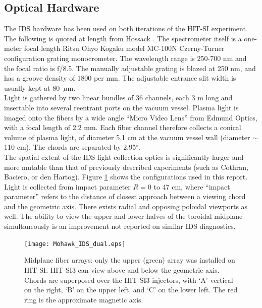 	\subsection{Optical Hardware}
	\hspace{4ex}The IDS hardware has been used on both iterations of the HIT-SI experiment. The following is quoted at length from  Hossack \cite{hossack2015study}. The spectrometer itself is a one-meter focal length Ritsu Ohyo Kogaku model MC-100N Czerny-Turner configuration grating monocrometer. The wavelength range is 250-700 nm and the focal ratio is f/8.5. The manually adjustable grating is blazed at 250 nm, and has a groove density of 1800 per mm. The adjustable entrance slit width is usually kept at 80~$\mu$m.\\
	\hspace*{4ex}Light is gathered by two linear bundles of 36 channels, each 3 m long and insertable into several reentrant ports on the vacuum vessel. Plasma light is imaged onto the fibers by a wide angle ``Micro Video Lens'' from Edmund Optics, with a focal length of 2.2 mm. Each fiber channel therefore collects a conical volume of plasma light, of diameter 5.1 cm at the vacuum vessel wall (diameter $\sim$110 cm). The chords are separated by 2.95$^{\circ}$.\\
	\hspace*{4ex}The spatial extent of the IDS light collection optics is significantly larger and more mutable than that of previously described experiments (such as Cothran\cite{cothran2006fast}, Baciero\cite{Baciero2001JT-II}, or den Hartog\cite{den1994fast}). Figure \ref{Fibers Midplane} shows the configurations used in this report. Light is collected from impact parameter $R = 0$ to 47 cm, where ``impact parameter'' refers to the distance of closest approach between a viewing chord and the geometric axis. There exists radial and opposing poloidal viewports as well. The ability to view the upper and lower halves of the toroidal midplane simultaneously is an improvement not reported on similar IDS diagnostics.
	\begin{center}
		\begin{figure}
			\texttt{[image: Mohawk\_IDS\_dual.eps]}
			\caption{Midplane fiber arrays: only the upper (green) array was installed on HIT-SI. HIT-SI3 can view above and below the geometric axis. Chords are superposed over the HIT-SI3 injectors, with `A' vertical on the right, `B' on the upper left, and `C' on the lower left. The red ring is the approximate magnetic axis.}\label{Fibers Midplane}
		\end{figure}
	\end{center}

